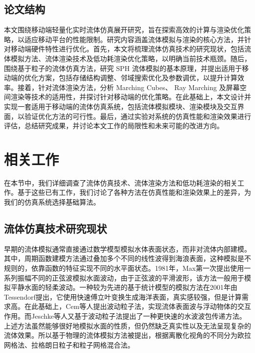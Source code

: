 \section{论文结构}

本文围绕移动端轻量化实时流体仿真展开研究，旨在探索高效的计算与渲染优化策略，以适应移动平台的性能限制。研究内容涵盖流体模拟与渲染的核心方法，并针对移动端硬件特性进行优化。首先，本文将梳理流体仿真技术的研究现状，包括流体模拟方法、流体渲染技术及低功耗渲染优化策略，以明确当前技术瓶颈。随后，围绕基于粒子的流体仿真方法，研究 SPH 流体模拟的基本原理，并提出适用于移动端的优化方案，包括存储结构调整、邻域搜索优化及参数调优，以提升计算效率。接着，针对流体渲染方法，分析 Marching Cubes、 Ray Marching 及屏幕空间渲染等技术的适用性，并探讨针对移动端的优化策略。在此基础上，本文设计并实现一套适用于移动端的流体仿真系统，包括流体模拟模块、渲染模块及交互界面，以验证优化方法的可行性。最后，通过实验对系统的仿真性能和渲染效果进行评估，总结研究成果，并讨论本文工作的局限性和未来可能的改进方向。

\chapter{相关工作}

\indent 在本节中，我们详细调查了流体仿真技术、流体渲染方法和低功耗渲染的相关工作。基于这些已有工作，我们讨论了各种方法在仿真性能和渲染效果上的差异，为我们的仿真系统选择基础算法。

\section{流体仿真技术研究现状}

早期的流体模拟通常直接通过数学模型模拟水体表面状态，而非对流体内部建模。其中，周期函数建模方法通过叠加多个不同的线性波得到海浪表面，这种模拟是不规则的，依靠函数的特征实现不同的水平面状态。1981年，Max\cite{max1981vectorized}第一次提出使用一系列振幅不同的正弦波模拟水面波动，由于正弦波的平滑波形，该方法一般用于模拟平静水面的轻柔波动。一种较为先进的基于统计模型的模拟方法在2001年由Tessendorf\cite{tessendorf2001simulating}提出，它使用快速傅立叶变换生成海洋表面，真实感较强，但是计算需求高。在此基础上，Cem等人\cite{yuksel2007wave}提出波动粒子法，实现流体表面波与浮动物体的交互作用。而Jeschke等人\cite{jeschke2015water}又基于波动粒子法提出了一种更快速的水波波包传递方法。
上述方法虽然能够很好地模拟水面的性质，但仍然缺乏真实性以及无法呈现复杂的流体效果。所以基于物理的流体模拟方法被提出，根据离散化视角的不同分为欧拉网格法、拉格朗日粒子和粒子网格混合法。


